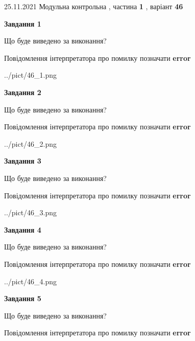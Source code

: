 \documentclass[10pt, ukrainian]{article}
\begin{document}
{25.11.2021 Модульна контрольна , частина \textbf { 1 }, варіант  \No \textbf { 46 }\par}
{
\begin {large}

{\begin {center}\textbf{Завдання 1}\end {center}}\par
Що буде виведено за виконання? \par
Повідомлення інтерпретатора про помилку позначати \textbf{error}

\begin{center}
	{../pict/46_1.png}
\end{center}
\newpage

{\begin {center}\textbf{Завдання 2}\end {center}}\par
Що буде виведено за виконання? \par
Повідомлення інтерпретатора про помилку позначати \textbf{error}

\begin{center}
	{../pict/46_2.png}
\end{center}
\newpage

{\begin {center}\textbf{Завдання 3}\end {center}}\par
Що буде виведено за виконання? \par
Повідомлення інтерпретатора про помилку позначати \textbf{error}

\begin{center}
	{../pict/46_3.png}
\end{center}
\newpage

{\begin {center}\textbf{Завдання 4}\end {center}}\par
Що буде виведено за виконання? \par
Повідомлення інтерпретатора про помилку позначати \textbf{error}

\begin{center}
	{../pict/46_4.png}
\end{center}
\newpage

{\begin {center}\textbf{Завдання 5}\end {center}}\par
Що буде виведено за виконання? \par
Повідомлення інтерпретатора про помилку позначати \textbf{error}


\end{large}}
\end{document}
